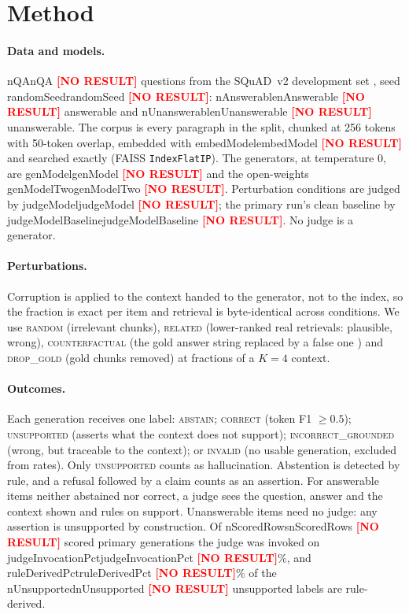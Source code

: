 \documentclass[11pt]{article}
\newcommand{\NUM}[1]{%
  \ifcsname #1\endcsname\csname #1\endcsname\else
  \textcolor{red}{\textbf{[NO RESULT]}}\fi}
\begin{document}
\section{Method}
\label{sec:method}
\paragraph{Data and models.}
\NUM{nQA} questions from the SQuAD~v2 development set \citep{rajpurkar2018squad2}, seed
\NUM{randomSeed}: \NUM{nAnswerable} answerable and \NUM{nUnanswerable} unanswerable.
The corpus is every paragraph in the split, chunked at 256 tokens with 50-token
overlap, embedded with \NUM{embedModel} and searched exactly (FAISS
\texttt{IndexFlatIP}). The generators, at temperature 0, are \NUM{genModel} and the
open-weights \NUM{genModelTwo}. Perturbation conditions are judged by \NUM{judgeModel};
the primary run's clean baseline by \NUM{judgeModelBaseline}. No judge is a generator.

\paragraph{Perturbations.}
Corruption is applied to the context handed to the generator, not to the index, so the
fraction is exact per item and retrieval is byte-identical across conditions. We use
\textsc{random} (irrelevant chunks), \textsc{related} (lower-ranked real retrievals:
plausible, wrong), \textsc{counterfactual} (the gold answer string replaced by a false
one \citep{longpre2021conflicts}) and \textsc{drop\_gold} (gold chunks removed) at
fractions of a $K{=}4$ context.

\paragraph{Outcomes.}
Each generation receives one label: \textsc{abstain}; \textsc{correct} (token F1
$\geq 0.5$); \textsc{unsupported} (asserts what the context does not support);
\textsc{incorrect\_grounded} (wrong, but traceable to the context); or \textsc{invalid}
(no usable generation, excluded from rates). Only \textsc{unsupported} counts as
hallucination. Abstention is detected by rule, and a refusal followed by a claim counts
as an assertion. For answerable items neither abstained nor correct, a judge sees the
question, answer and the context shown and rules on support. Unanswerable items need no
judge: any assertion is unsupported by construction. Of \NUM{nScoredRows} scored
primary generations the judge was invoked on \NUM{judgeInvocationPct}\%, and
\NUM{ruleDerivedPct}\% of the \NUM{nUnsupported} unsupported labels are rule-derived.
\end{document}
